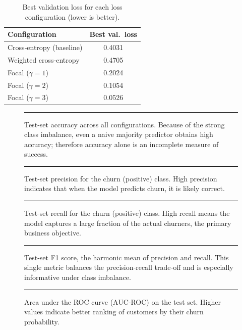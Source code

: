 \documentclass[11pt,a4paper]{article}
\begin{document}
\begin{table}[H]
\centering
\caption{Best validation loss for each loss configuration (lower is better).}
\label{tab:val_loss}
\begin{tabular}{lc}
\toprule
\textbf{Configuration} & \textbf{Best val.\ loss} \\
\midrule
Cross‑entropy (baseline) & 0.4031 \\
Weighted cross‑entropy   & 0.4705 \\
Focal ($\gamma=1$)      & 0.2024 \\
Focal ($\gamma=2$)      & 0.1054 \\
Focal ($\gamma=3$)      & 0.0526 \\
\bottomrule
\end{tabular}
\end{table}


\begin{figure}[H]
\centering
\rule{0.45\textwidth}{3cm}
\caption{Test‑set accuracy across all configurations. Because of the strong class imbalance, even a naive majority predictor obtains high accuracy; therefore accuracy alone is an incomplete measure of success.}
\label{fig:accuracy}
\end{figure}

\begin{figure}[H]
\centering
\rule{0.45\textwidth}{3cm}
\caption{Test‑set precision for the churn (positive) class. High precision indicates that when the model predicts churn, it is likely correct.}
\label{fig:precision}
\end{figure}

\begin{figure}[H]
\centering
\rule{0.45\textwidth}{3cm}
\caption{Test‑set recall for the churn (positive) class. High recall means the model captures a large fraction of the actual churners, the primary business objective.}
\label{fig:recall}
\end{figure}

\begin{figure}[H]
\centering
\rule{0.45\textwidth}{3cm}
\caption{Test‑set F1 score, the harmonic mean of precision and recall. This single metric balances the precision‑recall trade‑off and is especially informative under class imbalance.}
\label{fig:f1_score}
\end{figure}

\begin{figure}[H]
\centering
\rule{0.45\textwidth}{3cm}
\caption{Area under the ROC curve (AUC‑ROC) on the test set. Higher values indicate better ranking of customers by their churn probability.}
\label{fig:auc_roc}
\end{figure}
\end{document}
